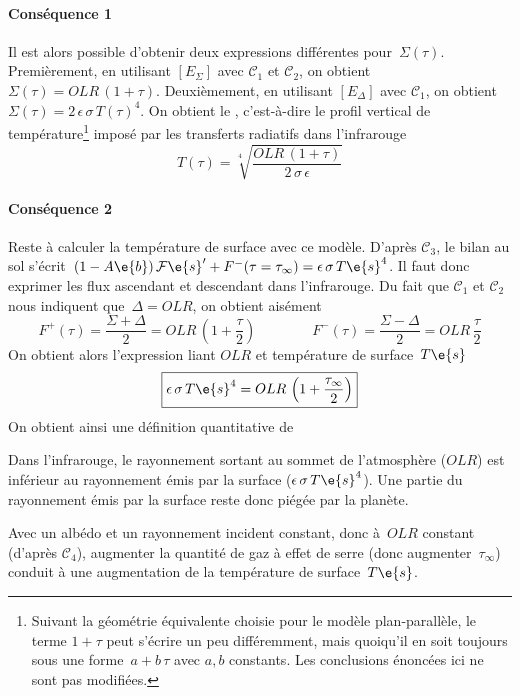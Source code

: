 \sk
\paragraph{Conséquence 1} Il est alors possible d'obtenir deux expressions différentes pour~$\Sigma(\tau)$.
Premièrement, en utilisant $[E_\Sigma]$ avec $\mathcal{C}_1$ et $\mathcal{C}_2$, on obtient~$\Sigma(\tau)=OLR \, (1+\tau)$.
Deuxièmement, en utilisant $[E_\Delta]$ avec $\mathcal{C}_1$, on obtient~$\Sigma(\tau)=2\,\epsilon\,\sigma\,T(\tau)^4$.
On obtient le , 
c'est-à-dire le profil vertical de température\footnote{Suivant la géométrie
équivalente choisie pour le modèle plan-parallèle, le terme $1+\tau$
peut s'écrire un peu différemment, mais quoiqu'il en soit toujours sous une
forme~$a+b\,\tau$ avec $a,b$ constants. Les conclusions énoncées ici ne sont pas
modifiées.} imposé par les transferts radiatifs dans l'infrarouge
\[
T(\tau) = \sqrt[4]{\frac{OLR\,(1+\tau)}{2\,\sigma\,\epsilon}}
\]

\sk
\paragraph{Conséquence 2} Reste à calculer la température de surface avec ce modèle. D'après $\mathcal{C}_3$, le bilan
au sol s'écrit~$(1-A\e{b}) \, \mathcal{F}\e{s}' + F^-(\tau=\tau_{\infty}) = \epsilon\,\sigma\,T\e{s}^4$.
Il faut donc exprimer les flux ascendant et descendant dans l'infrarouge.
Du fait que $\mathcal{C}_1$ et $\mathcal{C}_2$ nous indiquent que~$\Delta=OLR$, on obtient aisément
\[
F^+(\tau) = \frac{\Sigma+\Delta}{2} = OLR \, (1+\frac{\tau}{2})
\qquad \qquad
F^-(\tau) = \frac{\Sigma-\Delta}{2} = OLR \, \frac{\tau}{2}
\]
\noindent On obtient alors l'expression liant $OLR$
et température de surface~$T\e{s}$
\[
\boxed{\epsilon\,\sigma\,T\e{s}^4 = OLR \, \left( 1 + \frac{\tau_{\infty}}{2} \right)}
\]
\noindent On obtient ainsi une définition quantitative de 
\begin{citemize}
\item Dans l'infrarouge, le rayonnement sortant au sommet de l'atmosphère ($OLR$)
est inférieur au rayonnement émis par la surface ($\epsilon\,\sigma\,T\e{s}^4$).
Une partie du rayonnement émis par la surface reste donc piégée par la planète.
\item Avec un albédo et un rayonnement incident constant, donc à~$OLR$ constant (d'après $\mathcal{C}_4$),
augmenter la quantité de gaz à effet de serre (donc augmenter~$\tau_{\infty}$)
conduit à une augmentation de la température de surface~$T\e{s}$.
\end{citemize}

